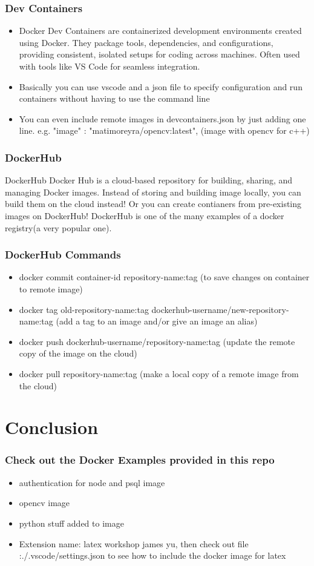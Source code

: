 \documentclass{beamer}
\begin{document}
\begin{frame}\frametitle{Dev Containers}
\begin{itemize}
\item Docker Dev Containers are containerized development environments created 
using Docker. They package tools, dependencies, and configurations, providing
consistent, isolated setups for coding across machines. Often used with tools
like VS Code for seamless integration.
\item Basically you can use vscode and a json file to specify configuration and run containers 
without having to use the command line
\item You can even include remote images in devcontainers.json
by just adding one line. e.g. "image" : "matimoreyra/opencv:latest", (image with opencv for c++)
\end{itemize}
\end{frame}


\begin{frame}\frametitle{DockerHub}
\begin{block}{DockerHub}
Docker Hub is a cloud-based repository for building, sharing, and managing Docker images. 
Instead of storing and building image locally, you can build them on the cloud instead!
Or you can create contianers from pre-existing images on DockerHub! DockerHub is one of the 
many examples of a docker registry(a very popular one). 
\end{block}
\end{frame}


\begin{frame}\frametitle{DockerHub Commands}
\begin{itemize}
\item docker commit container-id repository-name:tag (to save changes on container to remote image)
\item docker tag old-repository-name:tag dockerhub-username/new-repository-name:tag (add a tag to an image and/or give an image an alias)
\item docker push dockerhub-username/repository-name:tag (update the remote copy of the image on the cloud)
\item docker pull repository-name:tag (make a local copy of a remote image from the cloud)
\end{itemize}
\end{frame}


\section{Conclusion}
\begin{frame}\frametitle{Check out the Docker Examples provided in this repo}
\begin{itemize}
\item authentication for node and psql image
\item opencv image
\item python stuff added to image
\item Extension name: latex workshop james yu, then check out file :./.vscode/settings.json to see how to include the docker image for latex
\end{itemize}
\end{frame}
\end{document}
